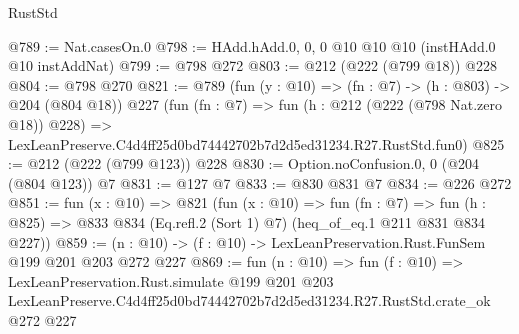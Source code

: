\begin{lexlean}{RustStd}
\begin{coremodule}
@789 := Nat.casesOn.{0}
@798 := HAdd.hAdd.{0, 0, 0} @10 @10 @10 (instHAdd.{0} @10 instAddNat)
@799 := @798 @272
@803 := @212 (@222 (@799 @18)) @228
@804 := @798 @270
@821 := @789
    (fun (y : @10) => (fn : @7) -> (h : @803) -> @204 (@804 @18))
    @227
    (fun (fn : @7) =>
    fun (h : @212 (@222 (@798 Nat.zero @18)) @228) =>
    LexLeanPreserve.C4d4ff25d0bd74442702b7d2d5ed31234.R27.RustStd.fun0)
@825 := @212 (@222 (@799 @123)) @228
@830 := Option.noConfusion.{0, 0} (@204 (@804 @123)) @7
@831 := @127 @7
@833 := @830 @831 @7
@834 := @226 @272
@851 := fun (x : @10) =>
  @821
    (fun (x : @10) =>
    fun (fn : @7) =>
    fun (h : @825) => @833 @834 (Eq.refl.{2} (Sort 1) @7) (heq_of_eq.{1} @211 @831 @834 @227))
@859 := (n : @10) -> (f : @10) -> LexLeanPreservation.Rust.FunSem @199 @201 @203 @272 @227
@869 := fun (n : @10) =>
  fun (f : @10) =>
  LexLeanPreservation.Rust.simulate
    @199
    @201
    @203
    LexLeanPreserve.C4d4ff25d0bd74442702b7d2d5ed31234.R27.RustStd.crate_ok
    @272
    @227
\end{coremodule}
\end{lexlean}

